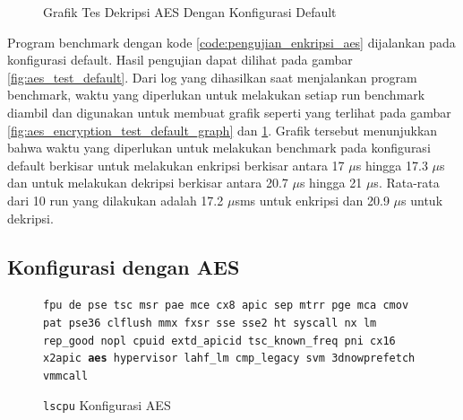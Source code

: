 \begin{figure}
    \centering
    \caption{Grafik Tes Dekripsi AES Dengan Konfigurasi Default}
    \label{fig:aes_decryption_test_default_graph}
\end{figure}

Program benchmark dengan kode \ref{code:pengujian_enkripsi_aes} dijalankan pada konfigurasi default. Hasil pengujian dapat dilihat pada gambar \ref{fig:aes_test_default}. Dari log yang dihasilkan saat menjalankan program benchmark, waktu yang diperlukan untuk melakukan setiap run benchmark diambil dan digunakan untuk membuat grafik seperti yang terlihat pada gambar \ref{fig:aes_encryption_test_default_graph} dan \ref{fig:aes_decryption_test_default_graph}. Grafik tersebut menunjukkan bahwa waktu yang diperlukan untuk melakukan benchmark pada konfigurasi default berkisar untuk melakukan enkripsi berkisar antara 17 $\mu$s hingga 17.3 $\mu$s dan untuk melakukan dekripsi berkisar antara 20.7 $\mu$s hingga 21 $\mu$s. Rata-rata dari 10 run yang dilakukan adalah 17.2 $\mu$sms untuk enkripsi dan 20.9 $\mu$s untuk dekripsi.

\subsection{Konfigurasi dengan AES}
\begin{figure}
    \texttt{fpu de pse tsc msr pae mce cx8 apic sep mtrr pge mca cmov pat pse36 clflush mmx fxsr sse sse2 ht syscall nx lm rep\_good nopl cpuid extd\_apicid tsc\_known\_freq pni cx16 x2apic \textbf{aes} hypervisor lahf\_lm cmp\_legacy svm 3dnowprefetch vmmcall}
    \caption{\texttt{lscpu} Konfigurasi AES}
    \label{fig:lscpu_aes_test_aes}
\end{figure}

